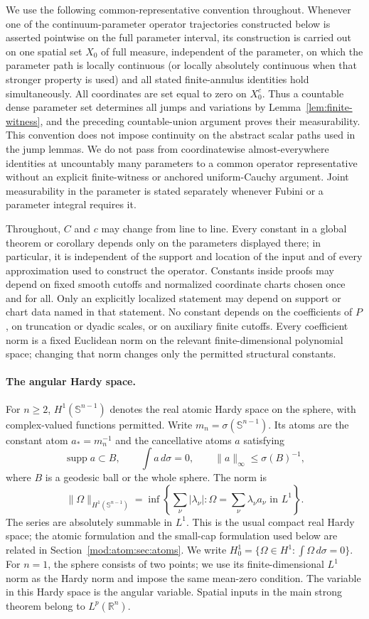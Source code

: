 \documentclass[11pt]{article}
\numberwithin{equation}{section}
\theoremstyle{remark}
\theoremstyle{definition}
\begin{document}
We use the following common-representative convention throughout.  Whenever
one of the continuum-parameter operator trajectories constructed below is
asserted pointwise on the full parameter interval, its construction is
carried out on one spatial set $X_0$ of full measure, independent of the
parameter, on which the parameter path is locally continuous (or locally
absolutely continuous when that stronger property is used) and all stated
finite-annulus identities hold simultaneously.  All coordinates are set
equal to zero on $X_0^c$.  Thus a countable dense parameter set determines
all jumps and variations by Lemma~\ref{lem:finite-witness}, and the preceding
countable-union argument proves their measurability.  This convention does
not impose continuity on the abstract scalar paths used in the jump lemmas.
We do not pass from coordinatewise almost-everywhere identities at
uncountably many parameters to a common operator representative without an
explicit finite-witness or anchored uniform-Cauchy argument.  Joint
measurability in the parameter is stated separately whenever Fubini or a
parameter integral requires it.

Throughout, \(C\) and \(c\) may change from line to line.  Every constant
in a global theorem or corollary depends only on the parameters displayed
there; in particular, it is independent of the support and location of the
input and of every approximation used to construct the operator.  Constants
inside proofs may depend on fixed smooth cutoffs and normalized coordinate
charts chosen once and for all.  Only an explicitly localized statement may
depend on support or chart data named in that statement.  No constant depends
on the coefficients of \(P\), on truncation or dyadic scales, or on auxiliary
finite cutoffs.  Every coefficient norm is a fixed Euclidean norm on the
relevant finite-dimensional polynomial space; changing that norm changes
only the permitted structural constants.

\paragraph{The angular Hardy space.}
For $n\ge2$, $H^1(\mathbb S^{n-1})$ denotes the real atomic Hardy
space on the sphere, with complex-valued functions permitted. Write
$m_n=\sigma(\mathbb S^{n-1})$. Its atoms are the constant atom
$a_*=m_n^{-1}$ and the cancellative atoms $a$ satisfying
\[
 \operatorname{supp}a\subset B,\qquad
 \int a\,d\sigma=0,\qquad
 \|a\|_\infty\le\sigma(B)^{-1},
\]
where $B$ is a geodesic ball or the whole sphere. The norm is
\[
 \|\Omega\|_{H^1(\mathbb S^{n-1})}
 =\inf\left\{\sum_\nu|\lambda_\nu|:
       \Omega=\sum_\nu\lambda_\nu a_\nu\text{ in }L^1\right\}.
\]
The series are absolutely summable in $L^1$. This is the usual compact
real Hardy space; the atomic formulation and the small-cap formulation
used below are related in Section~\ref{mod:atom:sec:atoms}.
We write $H^1_0=\{\Omega\in H^1:\int\Omega\,d\sigma=0\}$.
For $n=1$, the sphere consists of two points; we use its finite-dimensional
$L^1$ norm as the Hardy norm and impose the same mean-zero condition.
The variable in this Hardy space is the angular variable. Spatial
inputs in the main strong theorem belong to $L^p(\mathbb R^n)$.
\end{document}
